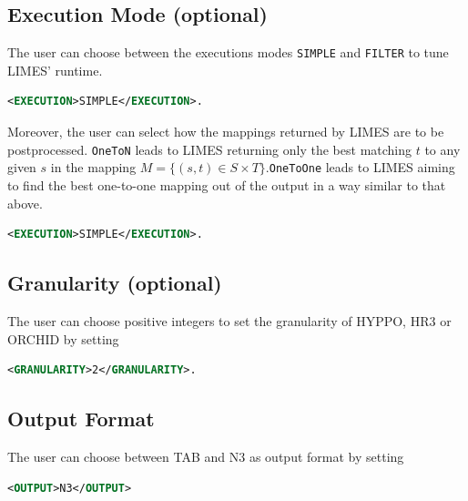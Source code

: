 \documentclass[a4paper, 11pt]{article}
\begin{document}
\subsection{Execution Mode (optional)}
The user can choose between the executions modes \texttt{SIMPLE} and \texttt{FILTER} to tune LIMES' runtime.
\begin{ttfamily}
\begin{lstlisting}[language=XML,basicstyle=\scriptsize,numberstyle=\tiny]
<EXECUTION>SIMPLE</EXECUTION>.
\end{lstlisting}
\end{ttfamily}
Moreover, the user can select how the mappings returned by LIMES are to be postprocessed. \texttt{OneToN} leads to LIMES returning only the best matching $t$ to any given $s$ in the mapping $M = \{(s, t) \in S \times T \}$.\texttt{OneToOne} leads to LIMES aiming to find the best one-to-one mapping out of the output in a way similar to that above.

\begin{ttfamily}
\begin{lstlisting}[language=XML,basicstyle=\scriptsize,numberstyle=\tiny]
<EXECUTION>SIMPLE</EXECUTION>.
\end{lstlisting}
\end{ttfamily}
\subsection{Granularity (optional)}

The user can choose positive integers to set the granularity of HYPPO, HR3 or ORCHID by setting

\begin{ttfamily}
\begin{lstlisting}[language=XML,basicstyle=\scriptsize,numberstyle=\tiny]
<GRANULARITY>2</GRANULARITY>.
\end{lstlisting}
\end{ttfamily}

\subsection{Output Format}
The user can choose between TAB and N3 as output format by setting

\begin{ttfamily}
\begin{lstlisting}[language=XML,basicstyle=\scriptsize,numberstyle=\tiny]
<OUTPUT>N3</OUTPUT>
\end{lstlisting}
\end{ttfamily}
\end{document}
